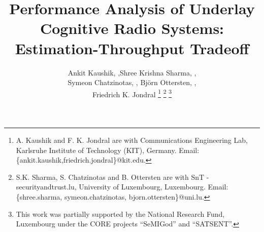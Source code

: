 \documentclass[12pt, draftclsnofoot, onecolumn]{IEEEtran}
\begin{document}
%
\title{Performance Analysis of Underlay Cognitive Radio Systems: Estimation-Throughput Tradeoff}
\author{Ankit Kaushik, ,Shree Krishna Sharma, , \\ Symeon Chatzinotas, ,  Bj\"orn Ottersten, , \\ Friedrich K. Jondral 
\thanks{A. Kaushik and F. K. Jondral are with Communications Engineering Lab, Karlsruhe Institute of Technology (KIT), Germany. Email:{\{ankit.kaushik,friedrich.jondral\}@kit.edu.}}
\thanks{S.K. Sharma, S. Chatzinotas and B. Ottersten are with SnT - securityandtrust.lu, University of Luxembourg, Luxembourg. Email:{\{shree.sharma, symeon.chatzinotas, bjorn.ottersten\}@uni.lu}.}
\thanks{This work was partially supported by the National Research Fund, Luxembourg under the CORE projects ``SeMIGod'' and ``SATSENT''.}
}
\end{document}
